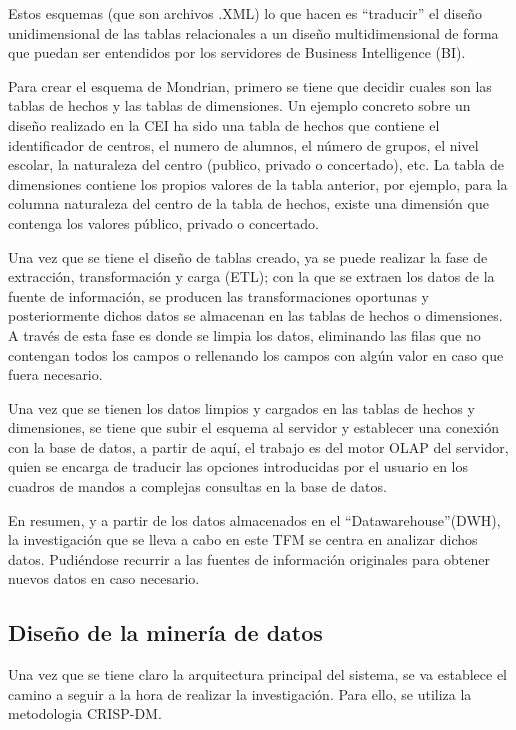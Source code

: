 Estos esquemas (que son archivos .XML) lo que hacen es ``traducir'' el diseño unidimensional de las tablas relacionales a un diseño multidimensional de forma que puedan ser entendidos por los servidores de Business Intelligence (BI). 

Para crear el esquema de Mondrian, primero se tiene que decidir cuales son las tablas de hechos y las tablas de dimensiones. Un ejemplo concreto sobre un diseño realizado en la CEI ha sido una tabla de hechos que contiene el identificador de centros, el numero de alumnos, el número de grupos, el nivel escolar, la naturaleza del centro (publico, privado o concertado), etc. La tabla de dimensiones contiene los propios valores de la tabla anterior, por ejemplo, para la columna naturaleza del centro de la tabla de hechos, existe una dimensión que contenga los valores público, privado o concertado.

Una vez que se tiene el diseño de tablas creado, ya se puede realizar la fase de extracción, transformación y carga (ETL); con la que se extraen los datos de la fuente de información, se producen las transformaciones oportunas y posteriormente dichos datos se almacenan en las tablas de hechos o dimensiones. A través de esta fase es donde se limpia los datos, eliminando las filas que no contengan todos los campos o rellenando los campos con algún valor en caso que fuera necesario.

Una vez que se tienen los datos limpios y cargados en las tablas de hechos y dimensiones, se tiene que subir el esquema al servidor y establecer una conexión con la base de datos, a partir de aquí, el trabajo es del motor OLAP del servidor, quien se encarga de traducir las opciones introducidas por el usuario en los cuadros de mandos a complejas consultas en la base de datos. 

En resumen, y a partir de los datos almacenados en el ``Datawarehouse''(DWH), la investigación que se lleva a cabo en este TFM se centra en analizar dichos datos. Pudiéndose recurrir a las fuentes de información originales para obtener nuevos datos en caso necesario. 

\subsection{Diseño de la minería de datos}
Una vez que se tiene claro la arquitectura principal del sistema, se va establece el camino a seguir a la hora de realizar la investigación. Para ello, se utiliza la metodologia CRISP-DM. 

